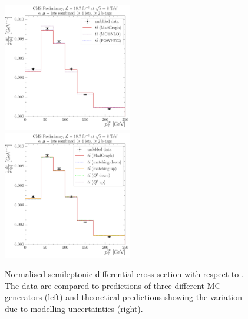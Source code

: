 \begin{figure}[!htbp]
	\centering
  	{\includegraphics[width=0.5\textwidth]{measurement/WPT/central/normalised_xsection_combined_different_generators}}\hfill
  	{\includegraphics[width=0.5\textwidth]{measurement/WPT/central/normalised_xsection_combined_systematics_shifts}}
    \caption[Normalised semileptonic \ttbar differential cross section with respect to \WPT]{Normalised semileptonic
      \ttbar differential cross section with respect to \WPT. The data are compared to predictions of three different MC
      generators (left) and theoretical predictions showing the variation due to modelling uncertainties (right).}
    \label{fig:results_WPT_combined}
\end{figure}

\newpage

